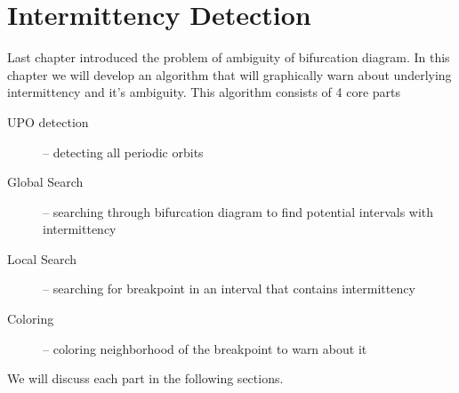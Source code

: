 \chapter{Intermittency Detection}
Last chapter introduced the problem of ambiguity of bifurcation diagram.
In this chapter we will develop an algorithm that will graphically warn about underlying intermittency and it's ambiguity.
This algorithm consists of 4 core parts

\begin{description}
    \item [UPO detection] -- detecting all periodic orbits
	\item [Global Search] -- searching through bifurcation diagram to find potential intervals with intermittency
	\item [Local Search] -- searching for breakpoint in an interval that contains intermittency
	\item [Coloring] -- coloring neighborhood of the breakpoint to warn about it
\end{description}

We will discuss each part in the following sections.

